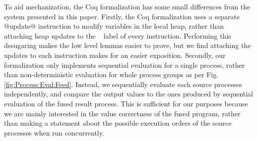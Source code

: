 To aid mechanization, the Coq formalization has some small differences from the system presented in this paper. Firstly, the Coq formalization uses a separate @update@ instruction to modify variables in the local heap, rather than attaching heap updates to the \Next~ label of every instruction. Performing this desugaring makes the low level lemmas easier to prove, but we find attaching the updates to each instruction makes for an easier exposition. Secondly, our formalization only implements sequential evaluation for a single process, rather than non-deterministic evaluation for whole process groups as per Fig.\ref{fig:Process:Eval:Feed}. Instead, we sequentially evaluate each source processes independently, and compare the output values to the ones produced by sequential evaluation of the fused result process. This is sufficient for our purposes because we are mainly interested in the value correctness of the fused program, rather than making a statement about the possible execution orders of the source processes when run concurrently.


